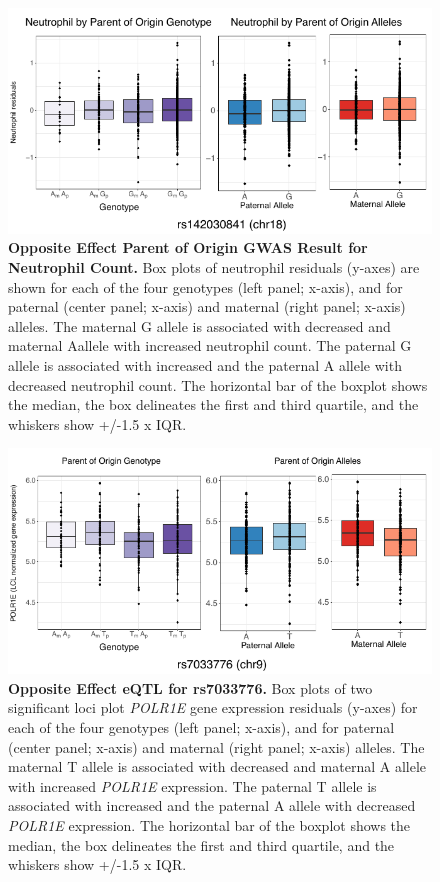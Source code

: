 \begin{figure}[!htb]
\centering
\includegraphics[width=5in]{img/ch02/fig-s14.pdf}
\caption[Opposite Effect Parent of Origin GWAS Result for Neutrophil Count.]{\textbf{Opposite Effect Parent of Origin GWAS Result for Neutrophil Count.}  Box plots of neutrophil residuals (y-axes) are shown for each of the four genotypes (left panel; x-axis), and for paternal (center panel; x-axis) and maternal (right panel; x-axis) alleles. The maternal G allele is associated with decreased and maternal Aallele with increased neutrophil count. The paternal G allele is associated with increased and the paternal A allele with decreased neutrophil count. The horizontal bar of the boxplot shows the median, the box delineates the first and third quartile, and the whiskers show +/-1.5 x IQR.}
\label{fig:fig-s14}
\end{figure}






\begin{figure}[!htb]
\centering
\includegraphics[width=5in]{img/ch02/fig-s15.pdf}
\caption[Opposite Effect eQTL for rs7033776.]{\textbf{Opposite Effect eQTL for rs7033776.} Box plots of two significant loci plot \emph{POLR1E} gene expression residuals (y-axes) for each of the four genotypes (left panel; x-axis), and for paternal (center panel; x-axis) and maternal (right panel; x-axis) alleles. The maternal T allele is associated with decreased and maternal A allele with increased \emph{POLR1E} expression. The paternal T allele is associated with increased and the paternal A allele with decreased \emph{POLR1E} expression. The horizontal bar of the boxplot shows the median, the box delineates the first and third quartile, and the whiskers show +/-1.5 x IQR.}
\label{fig:fig-s15}
\end{figure}



